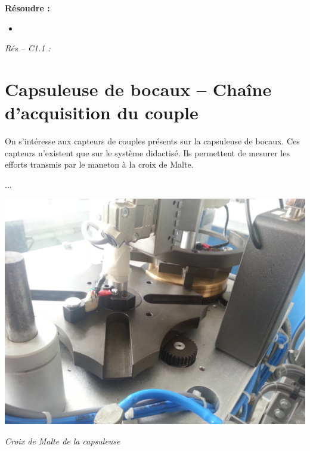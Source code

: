 \documentclass[10pt]{article}
\begin{document}






\begin{comp}
\noindent \textbf{Résoudre :} 
\begin{itemize}
\item 
\end{itemize}

\noindent \textit{Rés -- C1.1 :} 
\end{comp}

\section*{Capsuleuse de bocaux -- Chaîne d'acquisition du couple}



\begin{minipage}[c]{.6\linewidth}
On s'intéresse aux capteurs de couples présents sur la capsuleuse de bocaux. Ces capteurs n'existent que sur le système didactisé. Ils permettent de mesurer les efforts transmis par le maneton à la croix de Malte. 


\begin{obj}
...
\end{obj}

\end{minipage} \hfill
\begin{minipage}[c]{.35\linewidth}
\begin{center}
\includegraphics[width=\textwidth]{images/capsuleuse}

\textit{Croix de Malte de la capsuleuse}
\end{center}
\end{minipage}
\end{document}
